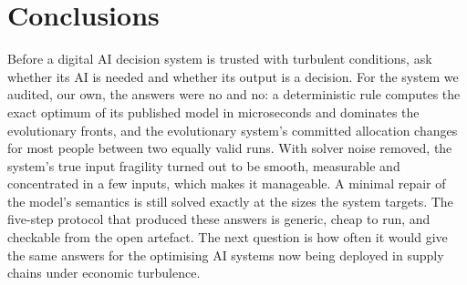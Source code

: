 \documentclass[systems,article,submit,moreauthors,pdftex]{Definitions/mdpi}
\begin{document}
\section{Conclusions}\label{sec:conclusion}
Before a digital AI decision system is trusted with turbulent conditions, ask whether its AI
is needed and whether its output is a decision. For the system we audited, our own, the
answers were no and no: a deterministic rule computes the exact optimum of its published
model in microseconds and dominates the evolutionary fronts, and the evolutionary system's
committed allocation changes for most people between two equally valid runs. With solver
noise removed, the system's true input fragility turned out to be smooth, measurable and
concentrated in a few inputs, which makes it manageable. A minimal repair of the model's
semantics is still solved exactly at the sizes the system targets. The five-step protocol
that produced these answers is generic, cheap to run, and checkable from the open artefact.
The next question is how often it would give the same answers for the optimising AI systems
now being deployed in supply chains under economic turbulence.

\appendix
\end{document}
